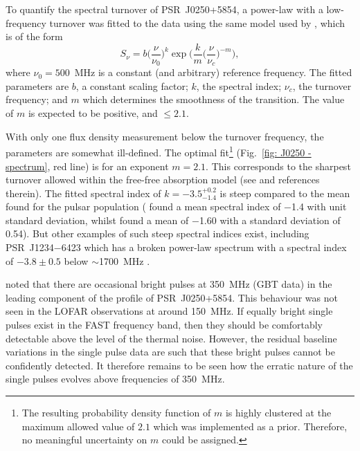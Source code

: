 To quantify the spectral turnover of PSR~J0250+5854, a power-law with a low-frequency turnover was fitted to the data using the same model used by \citet{JSK+2018}, which is of the form
\begin{equation}
\label{eq: J0250 - spectrum}
    S_\nu = b \bigg(\frac{\nu}{\nu_0}\bigg)^k \exp\bigg( \frac{k}{m} \bigg(\frac{\nu}{\nu_c}\bigg)^{-m}\bigg),
\end{equation}
where $\nu_0 = 500$~MHz is a constant (and arbitrary) reference frequency. The fitted parameters are $b$, a constant scaling factor; $k$, the spectral index; $\nu_c$, the turnover frequency; and $m$ which determines the smoothness of the transition. The value of $m$ is expected to be positive, and $\leq2.1$.

With only one flux density measurement below the turnover frequency, the parameters are somewhat ill-defined. The optimal fit\footnote{The resulting probability density function of $m$ is highly clustered at the maximum allowed value of $2.1$ which was implemented as a prior. Therefore, no meaningful uncertainty on $m$ could be assigned.} (Fig.~\ref{fig: J0250 - spectrum}, red line) is for an exponent $m=2.1$. This corresponds to the sharpest turnover allowed within the free-free absorption model (see \citet{JSK+2018} and references therein). The fitted spectral index of $k = -3.5^{+0.2}_{-1.4}$ is steep compared to the mean found for the pulsar population (\citealt{BLVx2013} found a mean spectral index of $-$1.4 with unit standard deviation, whilst \citealt{JSK+2018} found a mean of $-$1.60 with a standard deviation of 0.54). But other examples of such steep spectral indices exist, including PSR~J1234$-$6423 which has a broken power-law spectrum with a spectral index of $-3.8\pm0.5$ below $\sim$1700~MHz \citep{JSK+2018}.

\citet{TBC+2018} noted that there are occasional bright pulses at 350~MHz (GBT data) in the leading component of the profile of PSR~J0250+5854. This behaviour was not seen in the LOFAR observations at around 150~MHz. If equally bright single pulses exist in the FAST frequency band, then they should be comfortably detectable above the level of the thermal noise. However, the residual baseline variations in the single pulse data are such that these bright pulses cannot be confidently detected. It therefore remains to be seen how the erratic nature of the single pulses evolves above frequencies of 350~MHz.











